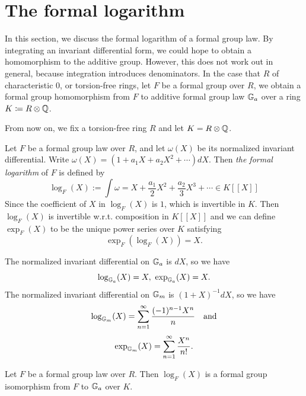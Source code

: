 \section{The formal logarithm}

In this section, we discuss the formal logarithm of a formal group law. By
integrating an invariant differential form, we could hope to obtain a homomorphism
to the additive group. However, this does not work out in general, because integration introduces
denominators. In the case that
$R$ of characteristic $0$, or torsion-free rings, let $F$ be a formal group over $R$,
we obtain a formal group homomorphism from $F$ to additive formal group law $\mathbb{G}_a$ over a ring
$K \coloneqq R \otimes \mathbb{Q}$.

From now on, we fix a torsion-free ring $R$ and let $K = R \otimes \mathbb{Q}$.

\begin{definition}
Let $F$ be a formal group law over $R$, and let $\omega(X)$ be its normalized invariant differential.
Write $\omega(X) = (1 + a_1 X + a_2 X ^ 2 + \cdots) dX$. Then \emph{the formal logarithm} of $F$
is defined by
    \[ \log_F (X) := \int \omega = X + \frac{a_1}{2} X^ 2 + \frac{a_2}{3} X ^ 3 + \cdots \in K [\![X]\!] \]
Since the coefficient of $X$ in $\log_F(X)$ is $1$, which is invertible in $K$.
Then $\log_F(X)$ is invertible w.r.t. composition in $K[\![X]\!]$ and we can define $\exp_F (X)$ to
be the unique power series over $K$ satisfying
    \[ \exp_F( \log_F (X)) = X. \]
\end{definition}

\begin{example}
    The normalized invariant differential on $\mathbb{G}_a$ is $dX$, so we have
    \[ \log_{\GG_a} (X) = X, \ \exp_{\GG_a}(X) = X. \]
    The normalized invariant differential on $\mathbb{G}_m$ is $(1 + X) ^ {-1} dX$, so we have
    \[ \log_{\mathbb{G}_m} (X) = \sum_{n=1}^{\infty} \frac{(-1)^{n-1}X ^ n}{n} \quad \text{and} \]
    \[ \exp_{\mathbb{G}_m} (X) = \sum_{n=1}^{\infty} \frac{X^n}{n!}. \]
\end{example}


\begin{proposition}
    Let $F$ be a formal group law over $R$. Then $\log_F(X)$ is a formal group isomorphism from
    $F$ to $\mathbb{G}_a$ over $K$.
\end{proposition}

